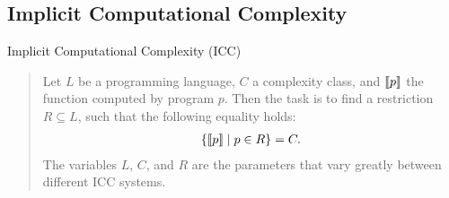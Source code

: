\subsection{Implicit Computational Complexity}
\label{subsec:icc}

Implicit Computational Complexity (ICC)~\cite{dallago2011}

\begin{quote}
Let \(L\) be a programming language, \(C\) a complexity class, and \(\llbracket p\rrbracket\) the function computed by program \(p\).
Then the task is to find a restriction \(R \subseteq L\), such that the following equality holds:
\begin{align*}
\{ \llbracket p\rrbracket \mid p \in R \} = C.
\end{align*}
The variables \(L\), \(C\), and \(R\) are the parameters that vary greatly between different ICC systems.
\end{quote}